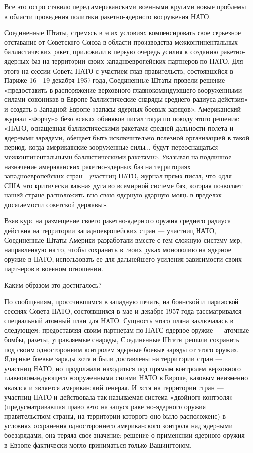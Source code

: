 \documentclass[12pt, a4paper, openany]{book}
\begin{document}
	Все это остро ставило перед американскими военными кругами новые проблемы в области проведения политики ракетно-ядерного вооружения НАТО.
	
	Соединенные Штаты, стремясь в этих условиях компенсировать свое серьезное отставание от Советского Союза в области производства межконтинентальных баллистических ракет, приложили в первую очередь усилия к созданию ракетно-ядерных баз на территории своих западноевропейских партнеров по НАТО. Для этого на сессии Совета НАТО с участием глав правительств, состоявшейся в Париже 16—19 декабря 1957 года, Соединенные Штаты провели решение — «предоставить в распоряжение верховного главнокомандующего вооруженными силами союзников в Европе баллистические снаряды среднего радиуса действия» и создать в Западной Европе «запасы ядерных боевых зарядов». Американский журнал «Форчун» безо всяких обиняков писал тогда по поводу этого решения: «НАТО, оснащенная баллистическими ракетами средней дальности полета и ядерными зарядами, обещает быть исключительно полезной организацией в такой период, когда американские вооруженные силы... будут переоснащаться межконтинентальными баллистическими ракетами». Указывая на подлинное назначение американских ракетно-ядерных баз на территориях западноевропейских стран—участниц НАТО, журнал прямо писал, что «для США это критически важная дуга во всемирной системе баз, которая позволяет нашей стране расположить всю свою ядерную ударную мощь в пределах досягаемости советской державы».
	
	Взяв курс на размещение своего ракетно-ядерного оружия среднего радиуса действия на территории западноевропейских стран — участниц НАТО, Соединенные Штаты Америки разработали вместе с тем сложную систему мер, направленную на то, чтобы сохранить в своих руках монополию на ядерное оружие в НАТО, использовать ее для дальнейшего усиления зависимости своих партнеров в военном отношении.
	
	Каким образом это достигалось?
	
	По сообщениям, просочившимся в западную печать, на боннской и парижской сессиях Совета НАТО, состоявшихся в мае и декабре 1957 года рассматривался специальный атомный план для НАТО. Сущность этого плана заключалась в следующем: предоставляя своим партнерам по НАТО ядерное оружие — атомные бомбы, ракеты, управляемые снаряды, Соединенные Штаты решили сохранить под своим односторонним контролем ядерные боевые заряды от этого оружия. Ядерные боевые заряды хотя и были доставлены на территории стран — участниц НАТО, но продолжали находиться под прямым контролем верховного главнокомандующего вооруженными силами НАТО в Европе, каковым неизменно являлся и является американский генерал. И хотя на территории стран — участниц НАТО и действовала так называемая система «двойного контроля» (предусматривавшая право вето на запуск ракетно-ядерного оружия правительством страны, на территории которого оно было расположено) в условиях сохранения одностороннего американского контроля над ядерными боезарядами, она теряла свое значение; решение о применении ядерного оружия в Европе фактически могло приниматься только Вашингтоном.
	
\end{document}
